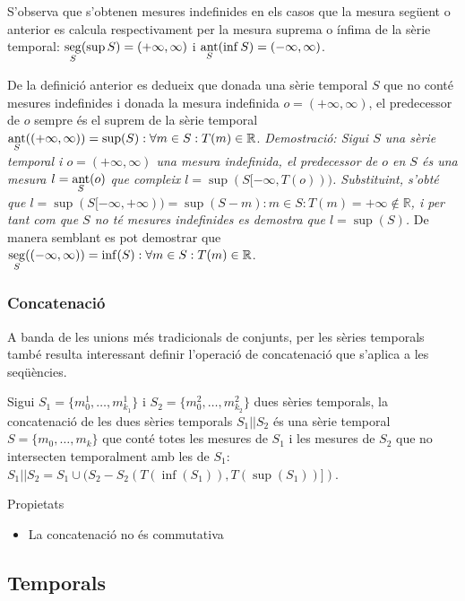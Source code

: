 S'observa que s'obtenen mesures indefinides en els casos que la
mesura següent o anterior es calcula respectivament per la mesura
suprema o ínfima de la sèrie temporal: $\operatorname*{seg}\limits_S(\sup
S)=(+\infty,\infty)$ i $\operatorname*{ant}\limits_S(\inf S)=(-\infty,\infty)$.

De la definició anterior es dedueix que donada una sèrie temporal $S$
que no conté mesures indefinides i donada la mesura indefinida
$o=(+\infty,\infty)$, el predecessor de $o$ sempre és el suprem de la
sèrie temporal $\operatorname*{ant}\limits_S( (+\infty,\infty) ) = \sup(S): \forall
m\in S: T(m)\in\mathbb{R}$.  %
\emph{Demostració: Sigui $S$ una sèrie temporal i $o=(+\infty,\infty)$
  una mesura indefinida, el predecessor de $o$ en $S$ és una mesura
  $l=\operatorname*{ant}\limits_S(o)$ que compleix
  $l=\sup(S[-\infty,T(o)))$. Substituint, s'obté que
  $l=\sup(S[-\infty,+\infty))=\sup(S-m):m\in S:T(m)=+\infty \notin
  \mathbb{R}$, i per tant com que $S$ no té mesures indefinides es
  demostra que $l=\sup(S)$.  } De manera semblant es pot demostrar que
$\operatorname*{seg}\limits_S( (-\infty,\infty) ) = \inf(S): \forall m\in S:
T(m)\in\mathbb{R}$.


\subsubsection{Concatenació}

A banda de les unions més tradicionals de conjunts, per les sèries
temporals també resulta interessant definir l'operació de concatenació
que s'aplica a les seqüències.

\begin{definition}[concatenació]
  Sigui $S_1=\{m_0^1, \dotsc, m_{k_1}^1\}$ i $S_2=\{m_0^2, \dotsc,
  m_{k_2}^2\}$ dues sèries temporals, la concatenació de les dues
  sèries temporals $S_1 || S_2$ és una sèrie temporal $S=\{m_0,
  \dotsc, m_k\}$ que conté totes les mesures de $S_1$ i les mesures de
  $S_2$ que no intersecten temporalment amb les de $S_1$: $S_1 ||
  S_2 =  S_1 \cup ( S_2 - S_2(T(\inf(S_1)),T(\sup(S_1))] )$.
\end{definition}

Propietats
\begin{itemize}
\item La concatenació no és commutativa
\end{itemize}




\subsection{Temporals}

